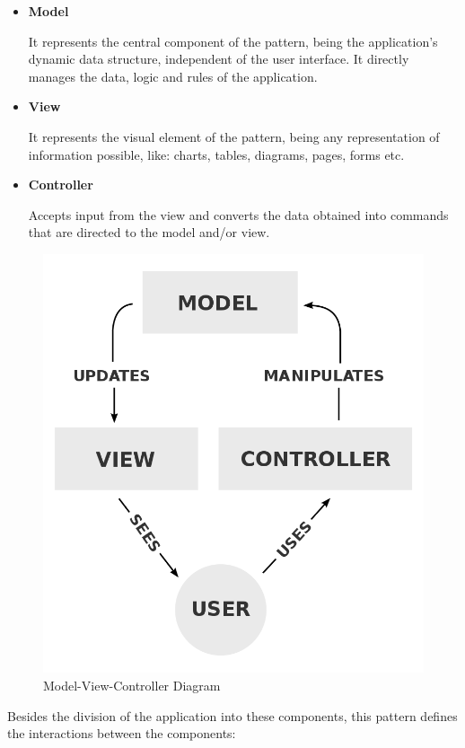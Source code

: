 \documentclass[12pt,a4paper,twoside]{report}
\begin{document}
\begin{itemize}
\item \textbf{Model}
		
It represents the central component of the pattern, being the application's dynamic data structure, independent of the user interface. It directly manages the data, logic and rules of the application.

\item \textbf{View}

It represents the visual element of the pattern, being any representation of information possible, like: charts, tables, diagrams, pages, forms etc. 

\item \textbf{Controller}

Accepts input from the view and converts the data obtained into commands that are directed to the model and/or view.
\end{itemize}

\begin{figure}
	\centering
	\includegraphics[scale=0.2]{img/MVCDiag.png}
	\caption{Model-View-Controller Diagram}
\end{figure}

Besides the division of the application into these components, this pattern defines the interactions between the components:
\end{document}
